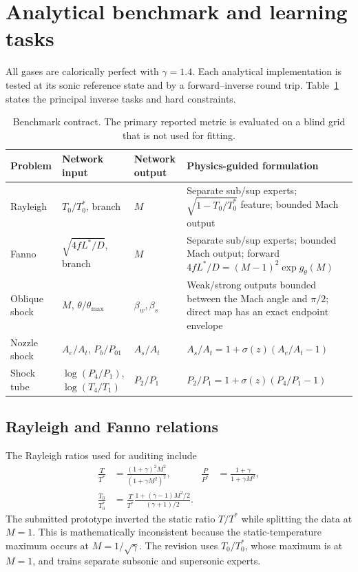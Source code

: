 \documentclass[11pt]{article}
\newenvironment{revision}{\color{revisionblue}}{}
\newenvironment{revision}{}{}
\begin{document}
\begin{revision}
\section{Analytical benchmark and learning tasks}
All gases are calorically perfect with $\gamma=1.4$. Each analytical implementation is tested at its sonic reference state and by a forward--inverse round trip. Table~\ref{tab:contract} states the principal inverse tasks and hard constraints.

\begin{table}[ht]
\centering
\caption{Benchmark contract. The primary reported metric is evaluated on a blind grid that is not used for fitting.}
\label{tab:contract}
\small
\begin{tabular}{p{2.15cm}p{2.5cm}p{2.65cm}p{5.0cm}}
\toprule
Problem & Network input & Network output & Physics-guided formulation \\
\midrule
Rayleigh & $T_0/T_0^*$, branch & $M$ & Separate sub/sup experts; $\sqrt{1-T_0/T_0^*}$ feature; bounded Mach output \\
Fanno & $\sqrt{4fL^*/D}$, branch & $M$ & Separate sub/sup experts; bounded Mach output; forward $4fL^*/D=(M-1)^2\exp g_\theta(M)$ \\
Oblique shock & $M$, $\theta/\theta_{\max}$ & $\beta_w,\beta_s$ & Weak/strong outputs bounded between the Mach angle and $\pi/2$; direct map has an exact endpoint envelope \\
Nozzle shock & $A_e/A_t$, $P_b/P_{01}$ & $A_s/A_t$ & $A_s/A_t=1+\sigma(z)(A_e/A_t-1)$ \\
Shock tube & $\log(P_4/P_1)$, $\log(T_4/T_1)$ & $P_2/P_1$ & $P_2/P_1=1+\sigma(z)(P_4/P_1-1)$ \\
\bottomrule
\end{tabular}
\end{table}

\subsection{Rayleigh and Fanno relations}
The Rayleigh ratios used for auditing include
\begin{align}
\frac{T}{T^*}&=\frac{(1+\gamma)^2M^2}{(1+\gamma M^2)^2}, &
\frac{P}{P^*}&=\frac{1+\gamma}{1+\gamma M^2},\\
\frac{T_0}{T_0^*}&=\frac{T}{T^*}\frac{1+(\gamma-1)M^2/2}{(\gamma+1)/2}.
\end{align}
The submitted prototype inverted the static ratio $T/T^*$ while splitting the data at $M=1$. This is mathematically inconsistent because the static-temperature maximum occurs at $M=1/\sqrt{\gamma}$. The revision uses $T_0/T_0^*$, whose maximum is at $M=1$, and trains separate subsonic and supersonic experts.


\end{revision}
\end{document}
